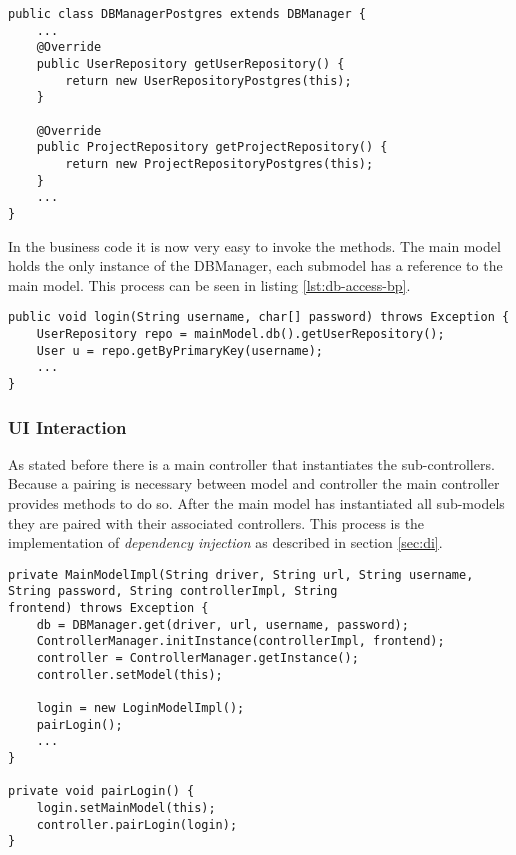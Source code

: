 \begin{lstlisting}[caption={Code snippet on how a DBManager implementation instantiates its repositories.}, captionpos=b]
public class DBManagerPostgres extends DBManager {
	...
	@Override
	public UserRepository getUserRepository() {
		return new UserRepositoryPostgres(this);
	}
	
	@Override
	public ProjectRepository getProjectRepository() {
		return new ProjectRepositoryPostgres(this);
	}
	...
}
\end{lstlisting}

In the business code it is now very easy to invoke the methods. The main model holds the only instance of the DBManager, each submodel has a reference to the main model. This process can be seen in listing \ref{lst:db-access-bp}.

\begin{lstlisting}[caption={[Code snippet showing how repositories are used in business code.]Code snippet showing how repositories are used in business code. The main model holds the single instance of the DBManager. Each sub-model accesses it by using a getter-method.}, captionpos=b, label={lst:db-access-bp}]
public void login(String username, char[] password) throws Exception {
	UserRepository repo = mainModel.db().getUserRepository();
	User u = repo.getByPrimaryKey(username);
	...
}
\end{lstlisting}

\subsubsection{UI Interaction}
As stated before there is a main controller that instantiates the sub-controllers. Because a pairing is necessary between model and controller the main controller provides methods to do so. After the main model has instantiated all sub-models they are paired with their associated controllers. This process is the implementation of \emph{dependency injection} as described in section \ref{sec:di}.

\begin{lstlisting}[caption={[Code snippet showing initialization code for the controller.]Code snippet showing initialization code for the controller. The main model retrieves the main controller by calling a getter which is similarily implemented as the DBManager class shown in listing \ref{lst:dbmanager}. After that he calls a method that pairs the sub-model with the sub-controller, a code snippet showing this process can be seen in listing \ref{lst:pairing}.}, captionpos=b, label={lst:db-manager-mono}]
private MainModelImpl(String driver, String url, String username, String password, String controllerImpl, String
frontend) throws Exception {
	db = DBManager.get(driver, url, username, password);
	ControllerManager.initInstance(controllerImpl, frontend);
	controller = ControllerManager.getInstance();
	controller.setModel(this);
	
	login = new LoginModelImpl();
	pairLogin();
	...
}

private void pairLogin() {
	login.setMainModel(this);
	controller.pairLogin(login);
}

\end{lstlisting}

